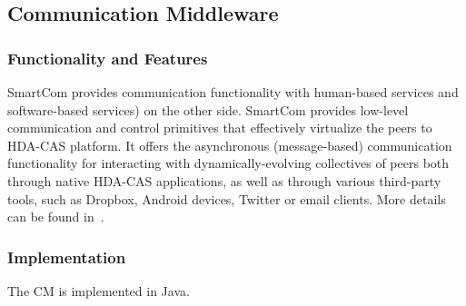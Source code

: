 \subsection{Communication Middleware}
\subsubsection{Functionality and Features}
SmartCom provides communication functionality with human-based services and software-based services) on the other side. SmartCom provides low-level communication and control primitives that effectively virtualize the peers to HDA-CAS platform. It offers the asynchronous (message-based) communication functionality for interacting with dynamically-evolving collectives of peers both through native HDA-CAS applications, as well as through various third-party tools, such as Dropbox, Android devices, Twitter or email clients. More details can be found in~\cite{D7.2}.
\subsubsection{Implementation}
The CM is implemented in Java.
